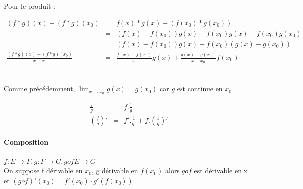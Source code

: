 			Pour le produit :
			
			$\begin{array}{rcl}
				(f*g)(x) - (f*g)(x_0) &=& f(x)*g(x) - (f(x_0)*g(x_0)) \\
																							   &=& (f(x)-f(x_0))g(x) + f(x_0)g(x) - f(x_0)g(x_0) \\
																							   &=& (f(x)-f(x_0))g(x) + f(x_0)(g(x) -g(x_0))\\
				\frac{(f*g)(x)-(f*g)(x_0)}{x-x_0} &=& \frac{f(x) - f(x_0)}{x_0}g(x) + \frac{g(x) - g(x_0)}{x-x_0}f(x_0)
			\end{array}$
			~\\
			~\\
			Comme précédemment, $\lim_{x \to x_0}{g(x)} = g(x_0)$ car $g$ est continue en $x_0$

			\[\begin{array}{rcl}
					\frac{f}{g} &=& f . \frac{1}{g} \\
					(\frac{f}{g})' &=& f'.\frac{1}{g'} + f.(\frac{1}{g})'
				\end{array}
			\]

			\paragraph{Composition} $f:E \rightarrow F, g : F \rightarrow G, gof E \rightarrow G$ ~\\
			On suppose f dérivable en $x_0$, g dérivable en $f(x_0)$ alors $gof$ est dérivable en x et $(gof)'(x_0) = f'(x_0)\cdot g'(f(x_0))$

